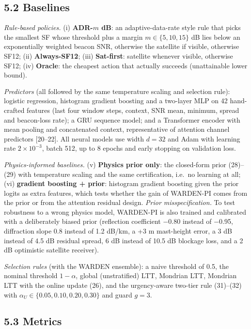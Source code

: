 \documentclass[
  11pt,
]{article}
\begin{document}
\hypertarget{baselines}{%
\subsection{5.2 Baselines}\label{baselines}}

\emph{Rule-based policies.} (i) \textbf{ADR-\(m\) dB}: an
adaptive-data-rate style rule that picks the smallest SF whose threshold
plus a margin \(m\in\{5,10,15\}\) dB lies below an exponentially
weighted beacon SNR, otherwise the satellite if visible, otherwise SF12;
(ii) \textbf{Always-SF12}; (iii) \textbf{Sat-first}: satellite whenever
visible, otherwise SF12; (iv) \textbf{Oracle}: the cheapest action that
actually succeeds (unattainable lower bound).

\emph{Predictors} (all followed by the same temperature scaling and
selection rule): logistic regression, histogram gradient boosting and a
two-layer MLP on 42 hand-crafted features (last four window steps,
context, SNR mean, minimum, spread and beacon-loss rate); a GRU sequence
model; and a Transformer encoder with mean pooling and concatenated
context, representative of attention channel predictors {[}20--22{]}.
All neural models use width \(d=32\) and Adam with learning rate
\(2\times10^{-3}\), batch 512, up to 8 epochs and early stopping on
validation loss.

\emph{Physics-informed baselines.} (v) \textbf{Physics prior only}: the
closed-form prior (28)--(29) with temperature scaling and the same
certification, i.e.~no learning at all; (vi) \textbf{gradient boosting +
prior}: histogram gradient boosting given the prior logits as extra
features, which tests whether the gain of WARDEN-PI comes from the prior
or from the attention residual design. \emph{Prior misspecification.} To
test robustness to a wrong physics model, WARDEN-PI is also trained and
calibrated with a deliberately biased prior (reflection coefficient
−0.80 instead of −0.95, diffraction slope 0.8 instead of 1.2 dB/km, a +3
m mast-height error, a 3 dB instead of 4.5 dB residual spread, 6 dB
instead of 10.5 dB blockage loss, and a 2 dB optimistic satellite
receiver).

\emph{Selection rules} (with the WARDEN ensemble): a naive threshold of
0.5, the nominal threshold \(1-\alpha\), global (unstratified) LTT,
Mondrian LTT, Mondrian LTT with the online update (26), and the
urgency-aware two-tier rule (31)--(32) with
\(\alpha_U\in\{0.05,0.10,0.20,0.30\}\) and guard \(g=3\).

\hypertarget{metrics}{%
\subsection{5.3 Metrics}\label{metrics}}
\end{document}
